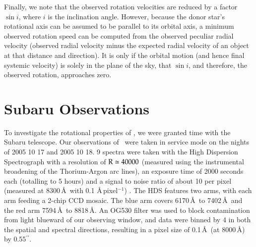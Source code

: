 Finally, we note that the observed rotation velocities are reduced by
a factor $\sin i$, where $i$ is the inclination angle.  However,
because the donor star's rotational axis can be assumed to be parallel
to its orbital axis, a minimum observed rotation speed can be computed
from the observed peculiar radial velocity (observed radial velocity
minus the expected radial velocity of an object at that distance and
direction). It is only if the orbital motion (and hence final systemic
velocity) is solely in the plane of the sky, that $\sin{i}$, and
therefore, the observed rotation, approaches
zero.\label{rotation_expl}

\section{Subaru Observations}
To investigate the rotational properties of \starg, we were granted time
with the Subaru telescope. Our observations of \starg\ were taken in
service mode on the nights of 2005 10 17 and 2005 10 18. 9
spectra were taken with the High Dispersion Spectrograph
\citep[HDS, ][]{1998SPIE.3355..354N} with a resolution of $\rm{R}\simeq40000$ (measured using the instrumental broadening of the Thorium-Argon arc lines), an
exposure time of 2000 seconds each (totalling to 5 hours) and a signal to noise ratio of about 10 per pixel (measured at $8300$\,\AA\ with 0.1 \AA\,pixel$^{-1}$) . The HDS
features two arms, with each arm feeding a 2-chip CCD mosaic. The blue
arm covers 6170\,\AA\ to 7402\,\AA\ and the red arm 7594\,\AA\ to
8818\,\AA. An OG530 filter was used to block contamination from light
blueward of our observing window, and data were binned by 4 in both
the spatial and spectral directions, resulting in a pixel size of
0.1\,\AA\ (at 8000\,\AA) by 0.55$^{\prime\prime}$.

